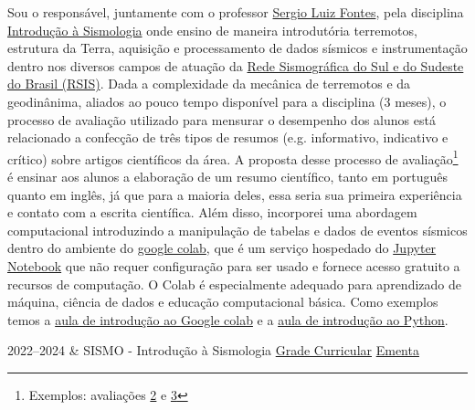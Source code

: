 \documentclass[10pt,a4paper,oneside]{book}
\begin{document}
Sou o responsável, juntamente com o professor \href{http://lattes.cnpq.br/8537150955145617}{Sergio Luiz Fontes}, pela disciplina \href{https://www.gov.br/observatorio/pt-br/assuntos/programas-academicos/pos-graduacao-em-geofisica/ementas/introducao-a-sismologia}{Introdução à Sismologia} onde ensino de maneira introdutória terremotos, estrutura da Terra, aquisição e processamento de dados sísmicos e instrumentação dentro nos diversos campos de atuação da \href{http://www.rsis.on.br/}{Rede Sismográfica do Sul e do Sudeste do Brasil (RSIS)}. Dada a complexidade da mecânica de terremotos e da geodinânima, aliados ao pouco tempo disponível para a disciplina (3 meses), o processo de avaliação utilizado para mensurar o desempenho dos alunos está relacionado a confecção de três tipos de resumos (e.g. informativo, indicativo e crítico) sobre artigos científicos da área. A proposta desse processo de avaliação\footnote{Exemplos: avaliações \href{https://docs.google.com/forms/d/e/1FAIpQLSffa78ttrM_i5cWZmISGNz-lhwShi3Wzk7AUbWPgN6lhDuTNQ/viewform}{2} e \href{https://docs.google.com/forms/d/e/1FAIpQLSe8FIH4vSjn5QLT79BdG8eVRLti0le8i6yssInmQTX1iXNrYA/viewform}{3}} é ensinar aos alunos a elaboração de um resumo científico, tanto em português quanto em inglês, já que para a maioria deles, essa seria sua primeira experiência e contato com a escrita científica. Além disso, incorporei uma abordagem computacional introduzindo a manipulação de tabelas e dados de eventos sísmicos dentro do ambiente do \href{https://colab.google/}{google colab}, que é um serviço hospedado do \href{https://jupyter.org/}{Jupyter Notebook} que não requer configuração para ser usado e fornece acesso gratuito a recursos de computação. O Colab é especialmente adequado para aprendizado de máquina, ciência de dados e educação computacional básica. Como exemplos temos a \href{https://colab.research.google.com/drive/1c7Vc_s0A5GURJIab2vTS-LCW8fPlRaXt?usp=sharing}{aula de introdução ao Google colab} e a \href{https://colab.research.google.com/drive/17VaW0MkQxcxUjGaeowaVwyRORrijCXaV?usp=sharing}{aula de introdução ao Python}.

\bigskip

\begin{subsummarybox}[frametitle=\faGraduationCap{}\quad Disciplinas ministradas no Observatório Nacional]
  \begin{courselist}
    2022--2024 &
      SISMO - Introdução à Sismologia
      \newline
      \faInfoCircle \href{https://www.gov.br/observatorio/pt-br/assuntos/programas-academicos/pos-graduacao-em-geofisica/grade-curricular}{Grade Curricular}
      \newline
      \faInbox \href{https://www.gov.br/observatorio/pt-br/assuntos/programas-academicos/pos-graduacao-em-geofisica/ementas/introducao-a-sismologia}{Ementa}
  \end{courselist}
\end{subsummarybox}
\end{document}
